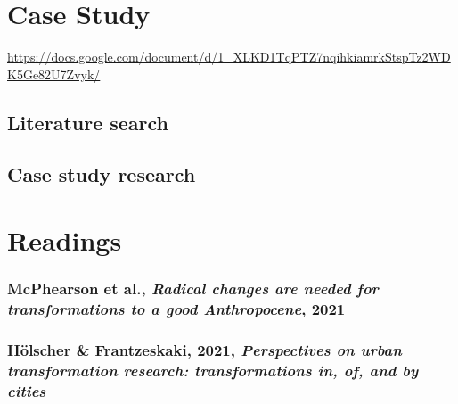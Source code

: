 \documentclass{article}
\begin{document}
\section{Case Study}

\url{https://docs.google.com/document/d/1_XLKD1TqPTZ7nqihkiamrkStspTz2WDK5Ge82U7Zvyk/}

\subsection{Literature search}

\subsubsection{ \textit{}}
\begin{outline}
	\1
\end{outline}

\subsection{Case study research}

\pagebreak

\section{Readings}

\subsubsection{McPhearson et al., \textit{Radical changes are needed for transformations to a good Anthropocene}, 2021}

\subsubsection{Hölscher \& Frantzeskaki, 2021, \textit{Perspectives on urban transformation research: transformations in, of, and by cities}}
\end{document}
